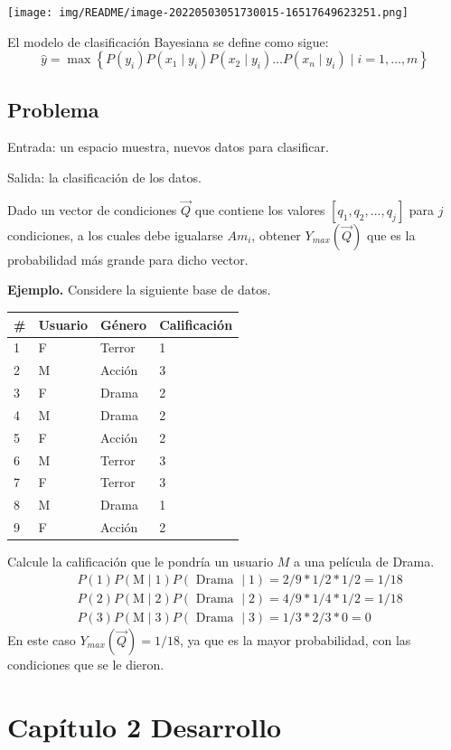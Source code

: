 \documentclass[
  spanish,
]{article}
\begin{document}
\texttt{[image: img/README/image-20220503051730015-16517649623251.png]}

El modelo de clasificación Bayesiana se define como sigue: \[
\hat{y}=\max \left\{P\left(y_{i}\right) P\left(x_{1} \mid y_{i}\right) P\left(x_{2} \mid y_{i}\right) \ldots P\left(x_{n} \mid y_{i}\right) \mid i=1, \ldots, m\right\}
\]

\hypertarget{problema}{%
\subsection{Problema}\label{problema}}

Entrada: un espacio muestra, nuevos datos para clasificar.

Salida: la clasificación de los datos.

Dado un vector de condiciones \(\vec{Q}\) que contiene los valores
\([q_1,q_2,...,q_j]\) para \(j\) condiciones, a los cuales debe
igualarse \(Am_i\), obtener \(Y_{max}(\vec{Q})\) que es la probabilidad
más grande para dicho vector.

\textbf{Ejemplo.} Considere la siguiente base de datos.

\begin{longtable}[]{@{}llll@{}}
\toprule
\# & Usuario & Género & Calificación\tabularnewline
\midrule
\endhead
1 & F & Terror & 1\tabularnewline
2 & M & Acción & 3\tabularnewline
3 & F & Drama & 2\tabularnewline
4 & M & Drama & 2\tabularnewline
5 & F & Acción & 2\tabularnewline
6 & M & Terror & 3\tabularnewline
7 & F & Terror & 3\tabularnewline
8 & M & Drama & 1\tabularnewline
9 & F & Acción & 2\tabularnewline
\bottomrule
\end{longtable}

Calcule la calificación que le pondría un usuario \(M\) a una película
de Drama. \[
\begin{aligned}
&P(1) P(\mathrm{M} \mid 1) P(\text { Drama } \mid 1)=2 / 9 * 1 / 2 * 1 / 2=1 / 18 \\
&P(2) P(\mathrm{M} \mid 2) P(\text { Drama } \mid 2)=4 / 9 * 1 / 4 * 1 / 2=1 / 18 \\
&P(3) P(\mathrm{M} \mid 3) P(\text { Drama } \mid 3)=1 / 3 * 2 / 3 * 0=0
\end{aligned}
\] En este caso \(Y_{max}(\vec{Q})=1/18\), ya que es la mayor
probabilidad, con las condiciones que se le dieron.

\hypertarget{capuxedtulo-2-desarrollo}{%
\section{Capítulo 2 Desarrollo}\label{capuxedtulo-2-desarrollo}}
\end{document}
